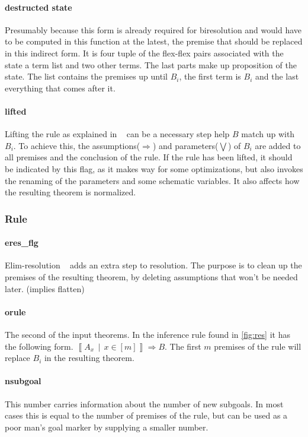 \paragraph{destructed state}
Presumably because this form is already required for biresolution and would have to be computed in this function at the latest, the premise that should be replaced in this indirect form. It is four tuple of the flex-flex pairs associated with the state a term list and two other terms. The last parts make up proposition of the state. The list contains the premises up until $B_i$, the first term is $B_i$ and the last everything that comes after it. 
\paragraph{lifted}
Lifting the rule as explained in ~\parencite{Paulson1994} can be a necessary step help $B$ match up with $B_i$. To achieve this, the assumptions($\Longrightarrow$) and parameters($\bigvee$) of $B_i$ are added to all premises and the conclusion of the rule. If the rule has been lifted, it should be indicated by this flag, as it makes way for some optimizations, but also invokes the renaming of the parameters and some schematic variables. It also affects how the resulting theorem is normalized.

\subsubsection{Rule}
\paragraph{eres\_flg}
Elim-resolution ~\parencite{Paulson1994} adds an extra step to resolution. The purpose is to clean up the premises of the resulting theorem, by deleting assumptions that won't be needed later. (implies flatten)
\paragraph{orule}
The second of the input theorems. In the inference rule found in \ref{fig:res} it has the following form. $\left\llbracket A_x\,\middle|\, x \in \left[ m \right] \right\rrbracket \Longrightarrow B$. The first $m$ premises of the rule will replace $B_i$ in the resulting theorem.
\paragraph{nsubgoal}
This number carries information about the number of new subgoals. In most cases this is equal to the number of premises of the rule, but can be used as a poor man's goal marker by supplying a smaller number.


